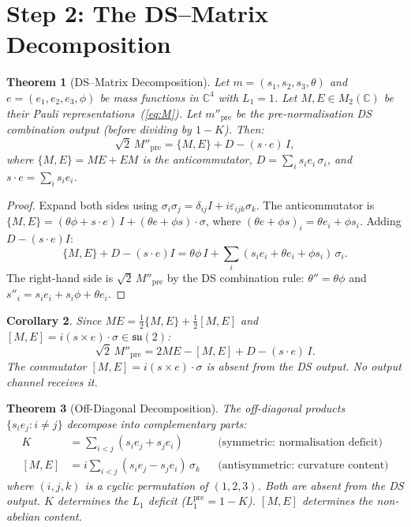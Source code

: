 \documentclass[11pt,a4paper]{article}
\newtheorem{theorem}{Theorem}[section]
\newtheorem{corollary}[theorem]{Corollary}
\theoremstyle{definition}
\theoremstyle{remark}
\newcommand{\C}{\mathbb{C}}
\newcommand{\su}{\mathfrak{su}}
\begin{document}
\section{Step 2: The DS--Matrix Decomposition}\label{sec:curvature}

\begin{theorem}[DS--Matrix Decomposition]\label{thm:dsmatrix}
Let $m=(s_1,s_2,s_3,\theta)$ and $e=(e_1,e_2,e_3,\phi)$ be mass functions in $\C^4$ with $L_1=1$. Let $M,E\in M_2(\C)$ be their Pauli representations~(\ref{eq:M}). Let $m''_{\mathrm{pre}}$ be the pre-normalisation DS combination output (before dividing by $1-K$). Then:
\begin{equation}\label{eq:dsmatrix}
\sqrt{2}\,M''_{\mathrm{pre}}=\{M,E\}+D-(s\cdot e)\,I,
\end{equation}
where $\{M,E\}=ME+EM$ is the anticommutator, $D=\sum_i s_ie_i\,\sigma_i$, and $s\cdot e=\sum_i s_ie_i$.
\end{theorem}

\begin{proof}
Expand both sides using $\sigma_i\sigma_j=\delta_{ij}I+i\varepsilon_{ijk}\sigma_k$. The anticommutator is $\{M,E\}=(\theta\phi+s\cdot e)\,I+(\theta e+\phi s)\cdot\sigma$, where $(\theta e+\phi s)_i=\theta e_i+\phi s_i$. Adding $D-(s\cdot e)I$:
\[
\{M,E\}+D-(s\cdot e)I=\theta\phi\,I+\sum_i(s_ie_i+\theta e_i+\phi s_i)\,\sigma_i.
\]
The right-hand side is $\sqrt{2}\,M''_{\mathrm{pre}}$ by the DS combination rule: $\theta''=\theta\phi$ and $s''_i=s_ie_i+s_i\phi+\theta e_i$.
\end{proof}

\begin{corollary}\label{cor:commutator}
Since $ME=\tfrac{1}{2}\{M,E\}+\tfrac{1}{2}[M,E]$ and $[M,E]=i(s\times e)\cdot\sigma\in\su(2)$:
\begin{equation}\label{eq:dscomm}
\sqrt{2}\,M''_{\mathrm{pre}}=2ME-[M,E]+D-(s\cdot e)\,I.
\end{equation}
The commutator $[M,E]=i(s\times e)\cdot\sigma$ is absent from the DS output. No output channel receives it.
\end{corollary}

\begin{theorem}[Off-Diagonal Decomposition]\label{thm:offdiag}
The off-diagonal products $\{s_ie_j:i\neq j\}$ decompose into complementary parts:
\begin{align}
K&=\sum_{i<j}(s_ie_j+s_je_i) &&\text{(symmetric: normalisation deficit)}\label{eq:Ksym}\\
[M,E]&=i\sum_{i<j}(s_ie_j-s_je_i)\,\sigma_k &&\text{(antisymmetric: curvature content)}\label{eq:commanti}
\end{align}
where $(i,j,k)$ is a cyclic permutation of $(1,2,3)$. Both are absent from the DS output. $K$ determines the $L_1$ deficit ($L_1^{\mathrm{pre}}=1-K$). $[M,E]$ determines the non-abelian content.
\end{theorem}
\end{document}

